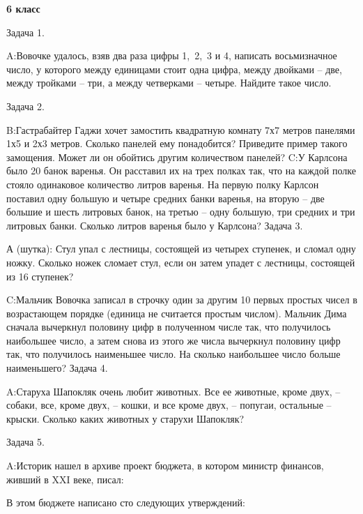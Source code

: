 \documentclass[11pt,a4paper,book]{ncc} \usepackage{modules/nonstahp_book}
\begin{document}
\medbreak\centerline{\bf 6 класс}\bigbreak\noindent

\bigbreak\noindent
Задача 1.\par\noindent
A:\qquad Вовочке удалось, взяв два раза цифры 1,\ 2,\ 3 и 4, написать восьмизначное число, у которого между единицами стоит одна цифра, между двойками -- две, между тройками -- три, а между четверками -- четыре. Найдите такое число.
\medbreak\noindent

\bigbreak\noindent Задача 2.\par\noindent

\medbreak\noindent
B:\qquad Гастрабайтер Гаджи хочет замостить квадратную комнату 7х7 метров панелями 1х5 и 2х3 метров. Сколько панелей ему понадобится? Приведите пример такого замощения. Может ли он обойтись другим количеством панелей?
\medbreak\noindent
C:\qquad  У Карлсона было 20 банок варенья. Он расставил их на трех полках так, что на каждой полке стояло одинаковое количество литров варенья. На первую полку Карлсон поставил одну большую и четыре средних банки варенья, на вторую --  две большие и шесть литровых банок, на третью -- одну большую, три средних и три литровых банки. Сколько литров варенья было у Карлсона?
\bigbreak\noindent
Задача 3.\par\noindent
А (шутка): \qquad Стул упал с лестницы, состоящей из четырех ступенек, и сломал одну ножку. Сколько ножек сломает стул, если он затем упадет с лестницы, состоящей из 16 ступенек?\medbreak\noindent

\medbreak\noindent
C:\qquad Мальчик Вовочка записал в строчку один за другим 10 первых простых чисел в возрастающем порядке (единица не считается простым числом). Мальчик Дима сначала вычеркнул половину цифр в полученном числе так, что получилось наибольшее число, а затем снова из этого же числа вычеркнул половину цифр так, что получилось наименьшее число.  На сколько наибольшее число больше наименьшего?
\bigbreak\noindent
Задача 4.\par\noindent
A:\qquad Старуха Шапокляк очень любит животных. Все ее животные, кроме двух, -- собаки, все, кроме двух, -- кошки, и все кроме двух, -- попугаи, остальные -- крыски. Сколько каких животных у старухи Шапокляк?
\medbreak\noindent

\bigbreak\noindent
Задача 5.\par\noindent
A:\qquad Историк  нашел в архиве проект бюджета, в котором министр финансов, живший в XXI веке, писал:\par
В этом бюджете написано сто следующих утверждений:
\end{document}
